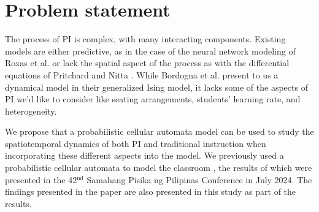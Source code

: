 \section{Problem statement}
The process of PI is complex, with many interacting components.
Existing models are either predictive, as in the case of the neural network modeling of Roxas et al. \cite{roxas2010seating} or lack the spatial aspect of the process as with the differential equations of Pritchard \cite{pritchard2008mathematical} and Nitta \cite{nitta2019mathematical}.
While Bordogna et al. \cite{bordogna2001theoretical,bordogna2003simulation} present to us a dynamical model in their generalized Ising model, it lacks some of the aspects of PI we'd like to consider like seating arrangements, students' learning rate, and heterogeneity.

We propose that a probabilistic cellular automata model can be used to study the spatiotemporal dynamics of both PI and traditional instruction when incorporating these different aspects into the model.
We previously used a probabilistic cellular automata to model the classroom \cite{SelfSPP}, the results of which were presented in the 42$^{\text{nd}}$ Samahang Pisika ng Pilipinas Conference in July 2024.
The findings presented in the paper are also presented in this study as part of the results.
